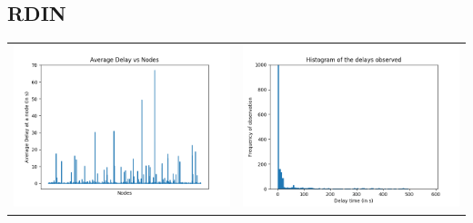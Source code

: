 \documentclass[twoside,11pt]{article}
\begin{document}
\subsection{RDIN}

\begin{tabular}{cc}

\includegraphics[scale=0.4]{img/IND/figure_1.png} 
&
\includegraphics[scale=0.4]{img/IND/figure_1-1.png} \\


\end{tabular}
\end{document}
